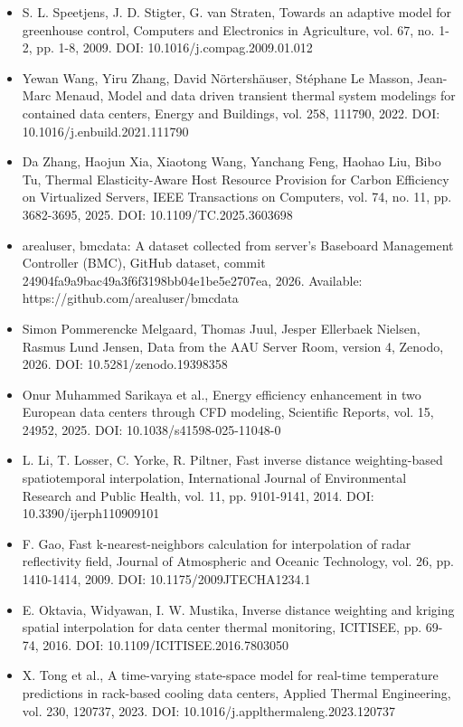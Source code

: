 \documentclass[12pt,a4paper]{article}
\begin{document}
\begin{itemize}
\item [32] S. L. Speetjens, J. D. Stigter, G. van Straten, Towards an adaptive model for greenhouse control, Computers and Electronics in Agriculture, vol. 67, no. 1-2, pp. 1-8, 2009. DOI: 10.1016/j.compag.2009.01.012
\item [33] Yewan Wang, Yiru Zhang, David Nörtershäuser, Stéphane Le Masson, Jean-Marc Menaud, Model and data driven transient thermal system modelings for contained data centers, Energy and Buildings, vol. 258, 111790, 2022. DOI: 10.1016/j.enbuild.2021.111790
\item [34] Da Zhang, Haojun Xia, Xiaotong Wang, Yanchang Feng, Haohao Liu, Bibo Tu, Thermal Elasticity-Aware Host Resource Provision for Carbon Efficiency on Virtualized Servers, IEEE Transactions on Computers, vol. 74, no. 11, pp. 3682-3695, 2025. DOI: 10.1109/TC.2025.3603698
\item [35] arealuser, bmcdata: A dataset collected from server's Baseboard Management Controller (BMC), GitHub dataset, commit 24904fa9a9bac49a3f6f3198bb04e1be5e2707ea, 2026. Available: https://github.com/arealuser/bmcdata
\item [36] Simon Pommerencke Melgaard, Thomas Juul, Jesper Ellerbaek Nielsen, Rasmus Lund Jensen, Data from the AAU Server Room, version 4, Zenodo, 2026. DOI: 10.5281/zenodo.19398358
\item [37] Onur Muhammed Sarikaya et al., Energy efficiency enhancement in two European data centers through CFD modeling, Scientific Reports, vol. 15, 24952, 2025. DOI: 10.1038/s41598-025-11048-0
\item [38] L. Li, T. Losser, C. Yorke, R. Piltner, Fast inverse distance weighting-based spatiotemporal interpolation, International Journal of Environmental Research and Public Health, vol. 11, pp. 9101-9141, 2014. DOI: 10.3390/ijerph110909101
\item [39] F. Gao, Fast k-nearest-neighbors calculation for interpolation of radar reflectivity field, Journal of Atmospheric and Oceanic Technology, vol. 26, pp. 1410-1414, 2009. DOI: 10.1175/2009JTECHA1234.1
\item [40] E. Oktavia, Widyawan, I. W. Mustika, Inverse distance weighting and kriging spatial interpolation for data center thermal monitoring, ICITISEE, pp. 69-74, 2016. DOI: 10.1109/ICITISEE.2016.7803050
\item [41] X. Tong et al., A time-varying state-space model for real-time temperature predictions in rack-based cooling data centers, Applied Thermal Engineering, vol. 230, 120737, 2023. DOI: 10.1016/j.applthermaleng.2023.120737
\end{itemize}
\end{document}
